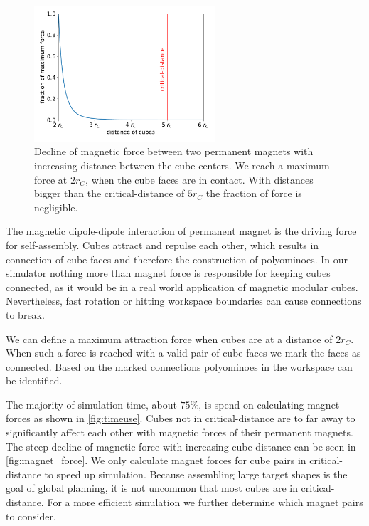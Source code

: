 \begin{figure}
	\centering
	\includegraphics[width=0.6\textwidth]{figures/plots/magnet_force.pdf}
	\caption[Declining magnetic forces with increasing cube distance.]{Decline of magnetic force between two permanent magnets with increasing distance between the cube centers. We reach a maximum force at $2 r_C$, when the cube faces are in contact. With distances bigger than the critical-distance of $5 r_C$ the fraction of force is negligible.}
	\label{fig:magnet_force}
\end{figure}

The magnetic dipole-dipole interaction of permanent magnet is the driving force for self-assembly.
Cubes attract and repulse each other, which results in connection of cube faces and therefore the construction of polyominoes.
In our simulator nothing more than magnet force is responsible for keeping cubes connected, as it would be in a real world application of magnetic modular cubes.
Nevertheless, fast rotation or hitting workspace boundaries can cause connections to break.

We can define a maximum attraction force when cubes are at a distance of $2 r_C$.
When such a force is reached with a valid pair of cube faces we mark the faces as connected.
Based on the marked connections polyominoes in the workspace can be identified.

The majority of simulation time, about $75\%$, is spend on calculating magnet forces as shown in \autoref{fig:timeuse}.
Cubes not in critical-distance are to far away to significantly affect each other with magnetic forces of their permanent magnets.
The steep decline of magnetic force with increasing cube distance can be seen in \autoref{fig:magnet_force}.
We only calculate magnet forces for cube pairs in critical-distance to speed up simulation.
Because assembling large target shapes is the goal of global planning, it is not uncommon that most cubes are in critical-distance.
For a more efficient simulation we further determine which magnet pairs to consider.

